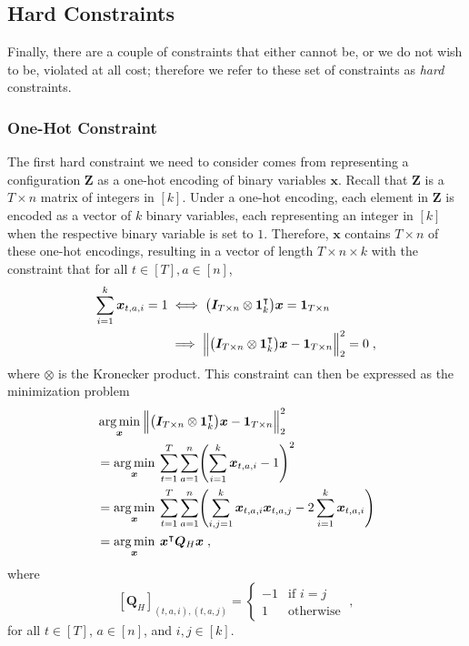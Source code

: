 \documentclass[conference]{IEEEtran}
\newcommand{\bZ}{\boldsymbol{Z}}
\newcommand{\bQ}{\boldsymbol{Q}}
\newcommand{\ones}[1]{\boldsymbol{1}_{#1}}
\newcommand{\ident}[1]{\boldsymbol{I}_{#1}}
\newcommand{\trans}{\intercal}
\newcommand{\indices}[1]{[#1]}
\newcommand{\bx}{\boldsymbol{x}}
\newcommand{\g}[1]{#1}
\renewcommand{\vec}[1]{\bm{#1}}
\DeclareMathOperator*{\argmin}{arg\,min}
\begin{document}
\subsection{Hard Constraints}\label{sec:qubo-hard-cons}
Finally, there are a couple of constraints that either cannot be, or we
do not wish to be, violated at all cost; therefore we refer to these set
of constraints as \textit{hard} constraints.

\subsubsection{One-Hot Constraint}
The first hard constraint we need to consider comes from representing a
configuration $\bZ$ as a one-hot encoding of binary variables
$\bx$. Recall that $\bZ$ is a $T\times n$ matrix of integers in
$\indices{k}$. Under a one-hot encoding, each element in $\bZ$ is
encoded as a vector of $k$ binary variables, each representing an
integer in $\indices{k}$ when the respective binary variable is set to
$1$. Therefore, $\bx$ contains $T\times n$ of these one-hot encodings,
resulting in a vector of length $T\times n \times k$ with the constraint
that for all $t\in\indices{T}, a\in\indices{n}$,
\begin{align}
  \label{eq:one-hot-constraint}
  \sum_{i=1}^{k} \g{\bx}_{t,a,i} = 1
  &\iff \bigl(\ident{T\times n} \otimes \ones{k}^{\trans}\bigr) \bx
    =\ones{T\times n}\\
  &\implies
    \Bigl\lVert\bigl(\ident{T\times n} \otimes \ones{k}^{\trans}\bigr)
    \bx - \vec{1}_{T\times n}\Bigr\rVert_{2}^{2}=0\;,
      \label{eq:con-one-hot}
\end{align}
where $\otimes$ is the Kronecker product. This constraint can then be
expressed as the minimization problem
\begin{align}
  &\argmin_{\bx}\: \Bigl\lVert\bigl(
  \ident{T\times n} \otimes \ones{k}^{\trans}\bigr) \bx -
    \vec{1}_{T\times n}\Bigr\rVert_{2}^{2}\nonumber\\
  &=\argmin_{\bx}\: \sum_{t=1}^{T}\sum_{a=1}^{n} \Biggl(
    \sum_{i=1}^{k}\bx_{t,a,i} - 1 \Biggr)^{2}\nonumber\\
  &=\argmin_{\bx}\: \sum_{t=1}^{T}\sum_{a=1}^{n} \Biggl(
    \sum_{i,j=1}^{k}\bx_{t,a,i}\bx_{t,a,j}
    - 2\sum_{i=1}^{k}\bx_{t,a,i}\Biggr)\nonumber\\
  &=\argmin_{\bx} \: \bx^{\trans} \bQ_{H} \bx\;,
\end{align}
where
\begin{equation}
  \label{eq:one-hot-qubo-mat}
  [\bQ_{H}]_{(t,a,i),(t,a,j)} =
  \begin{cases}
    -1 & \text{if } i = j\\
    1 & \text{otherwise}
  \end{cases}\;,
\end{equation}
for all $t\in\indices{T}$, $a\in\indices{n}$, and $i,j\in\indices{k}$.
\end{document}

